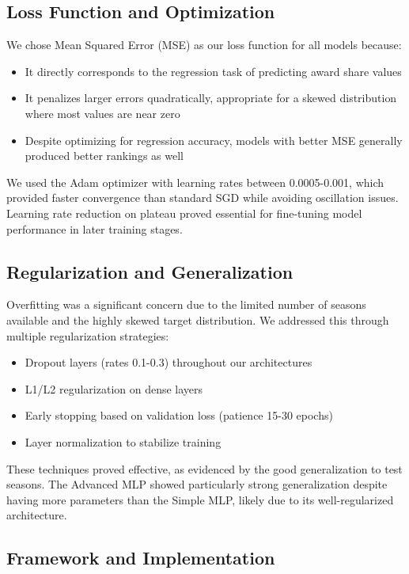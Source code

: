 \documentclass[10pt,twocolumn,letterpaper]{article}
\begin{document}
\subsection{Loss Function and Optimization}

We chose Mean Squared Error (MSE) as our loss function for all models because:
\begin{itemize}
    \item It directly corresponds to the regression task of predicting award share values
    \item It penalizes larger errors quadratically, appropriate for a skewed distribution where most values are near zero
    \item Despite optimizing for regression accuracy, models with better MSE generally produced better rankings as well
\end{itemize}

We used the Adam optimizer with learning rates between 0.0005-0.001, which provided faster convergence than standard SGD while avoiding oscillation issues. Learning rate reduction on plateau proved essential for fine-tuning model performance in later training stages.

\subsection{Regularization and Generalization}

Overfitting was a significant concern due to the limited number of seasons available and the highly skewed target distribution. We addressed this through multiple regularization strategies:

\begin{itemize}
    \item Dropout layers (rates 0.1-0.3) throughout our architectures
    \item L1/L2 regularization on dense layers
    \item Early stopping based on validation loss (patience 15-30 epochs)
    \item Layer normalization to stabilize training
\end{itemize}

These techniques proved effective, as evidenced by the good generalization to test seasons. The Advanced MLP showed particularly strong generalization despite having more parameters than the Simple MLP, likely due to its well-regularized architecture.

\subsection{Framework and Implementation}
\end{document}
